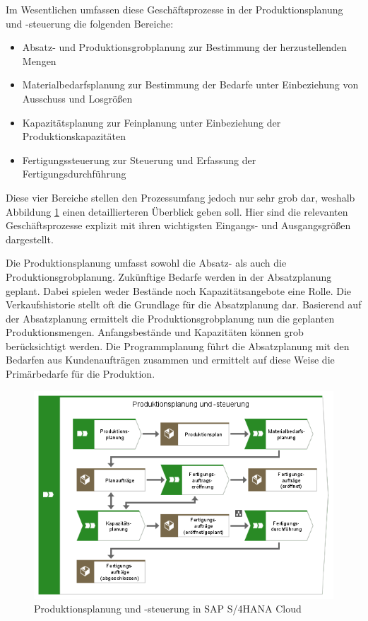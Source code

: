 Im Wesentlichen umfassen diese Geschäftsprozesse in der Produktionsplanung und -steuerung die folgenden Bereiche:

\begin{itemize}
    \item 
    Absatz- und Produktionsgrobplanung zur Bestimmung der herzustellenden Mengen
    \item 
    Materialbedarfsplanung zur Bestimmung der Bedarfe unter Einbeziehung von Ausschuss und Losgrößen
    \item 
    Kapazitätsplanung zur Feinplanung unter Einbeziehung der Produktionskapazitäten
    \item 
    Fertigungssteuerung zur Steuerung und Erfassung der Fertigungsdurchführung
\end{itemize}

Diese vier Bereiche stellen den Prozessumfang jedoch nur sehr grob dar, weshalb Abbildung \ref{fig:Prozessüberblick der Produktionsplanung und -steuerung} einen detaillierteren Überblick geben soll. Hier sind die relevanten Geschäftsprozesse explizit mit ihren wichtigsten Eingangs- und Ausgangsgrößen dargestellt.

Die Produktionsplanung umfasst sowohl die Absatz- als auch die Produktionsgrobplanung. Zukünftige Bedarfe werden in der Absatzplanung geplant. Dabei spielen weder Bestände noch Kapazitätsangebote eine Rolle. Die Verkaufshistorie stellt oft die Grundlage für die Absatzplanung dar. Basierend auf der Absatzplanung ermittelt die Produktionsgrobplanung nun die geplanten Produktionsmengen. Anfangsbestände und Kapazitäten können grob berücksichtigt werden. Die Programmplanung führt die Absatzplanung mit den Bedarfen aus Kundenaufträgen zusammen und ermittelt auf diese Weise die Primärbedarfe für die Produktion. 
\cite{Dickersbach.2014} 

\begin{figure}[H]
	\centering 
    \includegraphics[width=\textwidth]{img/Produktion.png}	
    \caption[Prozessüberblick der Produktionsplanung und -steuerung]
    {Produktionsplanung und -steuerung in SAP S/4HANA Cloud\protect\footnotemark}
    \label{fig:Prozessüberblick der Produktionsplanung und -steuerung}
\end{figure}

